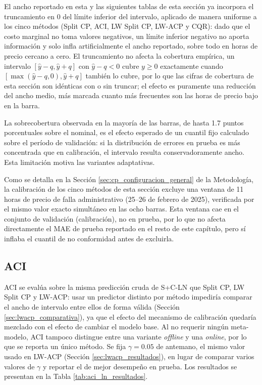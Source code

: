 El ancho reportado en esta y las siguientes tablas de esta sección ya incorpora el truncamiento en 0 del límite inferior del intervalo, aplicado de manera uniforme a los cinco métodos (Split CP, ACI, LW Split CP, LW-ACP y CQR): dado que el costo marginal no toma valores negativos, un límite inferior negativo no aporta información y solo infla artificialmente el ancho reportado, sobre todo en horas de precio cercano a cero. El truncamiento no afecta la cobertura empírica, un intervalo $[\hat{y}-q, \hat{y}+q]$ con $\hat y - q<0$ cubre $y\geq 0$ exactamente cuando $[\max(\hat y-q,0), \hat y+q]$ también lo cubre, por lo que las cifras de cobertura de esta sección son idénticas con o sin truncar; el efecto es puramente una reducción del ancho medio, más marcada cuanto más frecuentes son las horas de precio bajo en la barra.

La sobrecobertura observada en la mayoría de las barras, de hasta 1.7 puntos porcentuales sobre el nominal, es el efecto esperado de un cuantil fijo calculado sobre el período de validación: si la distribución de errores en prueba es más concentrada que en calibración, el intervalo resulta conservadoramente ancho. Esta limitación motiva las variantes adaptativas.

Como se detalla en la Sección \ref{sec:cp_configuracion_general} de la Metodología, la calibración de los cinco métodos de esta sección excluye una ventana de 11 horas de precio de falla administrativo (25--26 de febrero de 2025), verificada por el mismo valor exacto simultáneo en las ocho barras. Esta ventana cae en el conjunto de validación (calibración), no en prueba, por lo que no afecta directamente el MAE de prueba reportado en el resto de este capítulo, pero sí inflaba el cuantil de no conformidad antes de excluirla.

\subsection{ACI}
\label{sec:aci}

ACI se evalúa sobre la misma predicción cruda de S+C-LN que Split CP, LW Split CP y LW-ACP: usar un predictor distinto por método impediría comparar el ancho de intervalo entre ellos de forma válida (Sección \ref{sec:lwacp_comparativa}), ya que el efecto del mecanismo de calibración quedaría mezclado con el efecto de cambiar el modelo base. Al no requerir ningún meta-modelo, ACI tampoco distingue entre una variante \textit{offline} y una \textit{online}, por lo que se reporta un único método. Se fija $\gamma = 0.05$ de antemano, el mismo valor usado en LW-ACP (Sección \ref{sec:lwacp_resultados}), en lugar de comparar varios valores de $\gamma$ y reportar el de mejor desempeño en prueba. Los resultados se presentan en la Tabla \ref{tab:aci_ln_resultados}.

